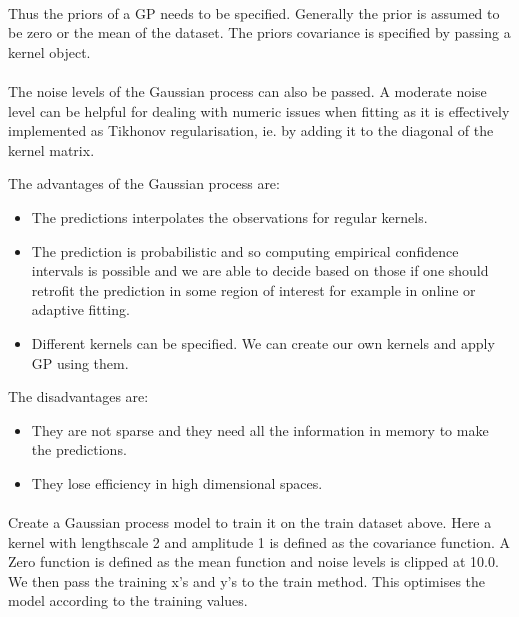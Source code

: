 \documentclass{book}
\begin{document}
\paragraph{}%
Thus the priors of a GP needs to be specified. Generally the prior is assumed to be zero or the mean of the dataset. The priors covariance is specified by passing a kernel object.
\label{par:}

\paragraph{}%
The noise levels of the Gaussian process can also be passed. A moderate noise level can be helpful for dealing with numeric issues when fitting as it is effectively implemented as Tikhonov regularisation, ie. by adding it to the diagonal of the kernel matrix.
\label{par:}

The advantages of the Gaussian process are:

\begin{itemize}
	\item The predictions interpolates the observations for regular kernels.
	\item The prediction is probabilistic and so computing empirical confidence intervals is possible and we are able to decide based on those if one should retrofit the prediction in some region of interest for example in online or adaptive fitting.
	\item Different kernels can be specified. We can create our own kernels and apply GP using them.
\end{itemize}

The disadvantages are:

\begin{itemize}
	\item They are not sparse and they need all the information in memory to make the predictions.
	\item They lose efficiency in high dimensional spaces.
\end{itemize}

\paragraph{}%
Create a Gaussian process model to train it on the train dataset above. Here a kernel with lengthscale 2 and amplitude 1 is defined as the covariance function. A Zero function is defined as the mean function and noise levels is clipped at 10.0. We then pass the training x’s and y’s to the train method. This optimises the model according to the training values.
\label{par:}
\end{document}
